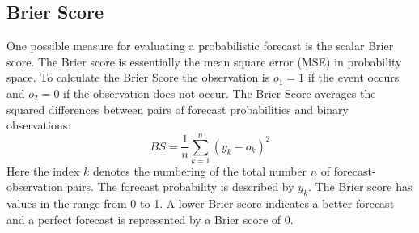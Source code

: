 \documentclass[11pt,twoside,a4paper,fleqn,x11names]{report}
\numberwithin{equation}{chapter}
\numberwithin{figure}{chapter}
\numberwithin{table}{chapter}
\begin{document}
\subsection{Brier Score}
One possible measure for evaluating a probabilistic forecast is the scalar Brier score. The Brier score is essentially the mean square error (MSE) in probability space. To calculate the Brier Score the observation is $o_1 = 1$ if the event occurs and $o_2 = 0$ if the observation does not occur. The Brier Score averages the squared differences between pairs of forecast probabilities and binary observations:
\begin{equation}
	BS = \frac{1}{n}\sum_{k=1}^{n}(y_{k}-o_{k})^{2}
	\label{eq:brier}
\end{equation}
Here the index $k$ denotes the numbering of the total number $n$ of forecast-observation pairs. The forecast probability is described by $y_k$. The Brier score has values in the range from 0 to 1. A lower Brier score indicates a better forecast and a perfect forecast is represented by a Brier score of 0. 
\end{document}

